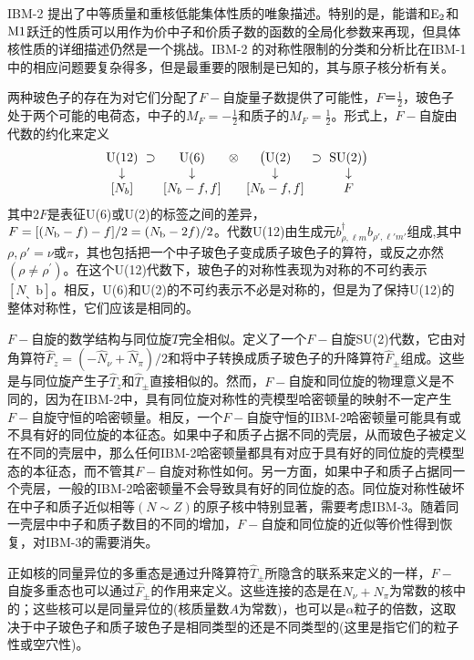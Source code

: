 IBM-2 提出了中等质量和重核低能集体性质的唯象描述。特别的是，能谱和${\rm E_2}$和${\rm M1}$跃迁的性质可以用作为价中子和价质子数的函数的全局化参数来再现，但具体核性质的详细描述仍然是一个挑战。IBM-2 的对称性限制的分类和分析比在IBM-1中的相应问题要复杂得多，但是最重要的限制是已知的，其与原子核分析有关。

两种玻色子的存在为对它们分配了$F-$自旋量子数提供了可能性，$F＝\frac{1}{2}$，玻色子处于两个可能的电荷态，中子的$M_F=-\frac{1}{2}$和质子的$M_F=\frac{1}{2}$。形式上，$F-$自旋由代数的约化来定义
\begin{equation*}
{\setlength\arraycolsep{3pt}\renewcommand{\arraystretch}{1}
\begin{array}{ccccccc}
{\rm U(12)}&\supset&{\rm U(6)}&\otimes&\big({\rm U(2)}&\supset&{\rm SU(2)}\big)\\
\downarrow& &\downarrow& &\downarrow& &\downarrow\\
\textrm{[}N_b\textrm{]}& &[N_b-f,f]& &[N_b-f,f]& &F
\end{array}}
\end{equation*}
其中$2F$是表征U(6)或U(2)的标签之间的差异，$F=[(N_{\rm b}-f)-f]/2=(N_{\rm b}-2f)/2$。代数U(12)由生成元$b^\dagger_{\rho,\ell m}b_{\rho',\ell'm'}$组成,其中$\rho,\rho'=\nu$或$\pi$，其也包括把一个中子玻色子变成质子玻色子的算符，或反之亦然$(\rho\ne\rho^\prime)$。在这个U(12)代数下，玻色子的对称性表现为对称的不可约表示$[N_、\textrm{b}]$。相反，U(6)和U(2)的不可约表示不必是对称的，但是为了保持U(12)的整体对称性，它们应该是相同的。

$F-$自旋的数学结构与同位旋$T$完全相似。定义了一个$F-$自旋SU(2)代数，它由对角算符$\hat{F}_z=(-\hat{N}_\nu+\hat{N}_\pi)/2$和将中子转换成质子玻色子的升降算符$\hat{F}_\pm$组成。这些是与同位旋产生子$\hat{T}_z$和$\hat{T}_\pm$直接相似的。然而，$F-$自旋和同位旋的物理意义是不同的，因为在IBM-2中，具有同位旋对称性的壳模型哈密顿量的映射不一定产生$F-$自旋守恒的哈密顿量。相反，一个$F-$自旋守恒的IBM-2哈密顿量可能具有或不具有好的同位旋的本征态。如果中子和质子占据不同的壳层，从而玻色子被定义在不同的壳层中，那么任何IBM-2哈密顿量都具有对应于具有好的同位旋的壳模型态的本征态，而不管其$F-$自旋对称性如何。另一方面，如果中子和质子占据同一个壳层，一般的IBM-2哈密顿量不会导致具有好的同位旋的态。同位旋对称性破坏在中子和质子近似相等$(N\sim Z)$的原子核中特别显著，需要考虑IBM-3。随着同一壳层中中子和质子数目的不同的增加，$F-$自旋和同位旋的近似等价性得到恢复，对IBM-3的需要消失。

正如核的同量异位的多重态是通过升降算符$\hat{T}_\pm$所隐含的联系来定义的一样，$F-$自旋多重态也可以通过$\hat{F}_\pm$的作用来定义。这些连接的态是在$N_\nu+N_\pi$为常数的核中的；这些核可以是同量异位的(核质量数$A$为常数)，也可以是$\alpha$粒子的倍数，这取决于中子玻色子和质子玻色子是相同类型的还是不同类型的(这里是指它们的粒子性或空穴性)。

